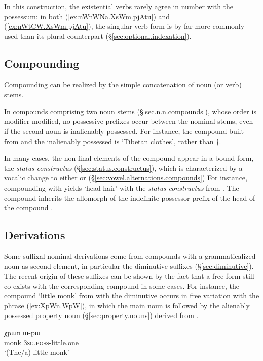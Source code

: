 In this construction, the existential verbs rarely agree in number with the possessum: in both (\ref{ex:nWnWNa.XsWm.pjAtu}) and (\ref{ex:nWtCW.XsWm.pjAtu}), the singular verb form  is by far more commonly used than its plural counterpart (§\ref{sec:optional.indexation}).

\subsection{Compounding}
Compounding can be realized by the simple concatenation of noun (or verb) stems.

In compounds comprising two noun stems (§\ref{sec.n.n.compounds}), whose order is modifier-modified, no possessive prefixes occur between the nominal stems, even if the second noun is inalienably possessed. For instance, the compound built from  and the inalienably possessed  is  `Tibetan clothes', rather than $\dagger$.

In many cases, the non-final elements of the compound appear in a bound form, the \textit{status constructus} (§\ref{sec:status.constructus}), which is characterized by a vocalic change to either  or  (§\ref{sec:vowel.alternations.compounds}) For instance, compounding  with  yields  `head hair' with the \textit{status constructus}  from . The compound inherits the allomorph  of the indefinite possessor prefix of the head of the compound .
 

\subsection{Derivations}
Some suffixal nominal derivations come from compounds with a grammaticalized noun as second element, in particular the diminutive suffixes (§\ref{sec:diminutive}). The recent origin of these suffixes can be shown by the fact that a free form still co-exists with the corresponding compound in some cases. For instance, the compound  `little monk' from  with the diminutive  occurs in free variation with the phrase (\ref{ex:XpWn.WpW}), in which the main noun is followed by the alienably possessed property noun  (§\ref{sec:property.nouns}) derived from .

\begin{exe}
\ex \label{ex:XpWn.WpW}
\gll χpɯn ɯ-pɯ \\
monk \textsc{3sg}.\textsc{poss}-little.one  \\
\glt `(The/a) little monk' 
\end{exe}

